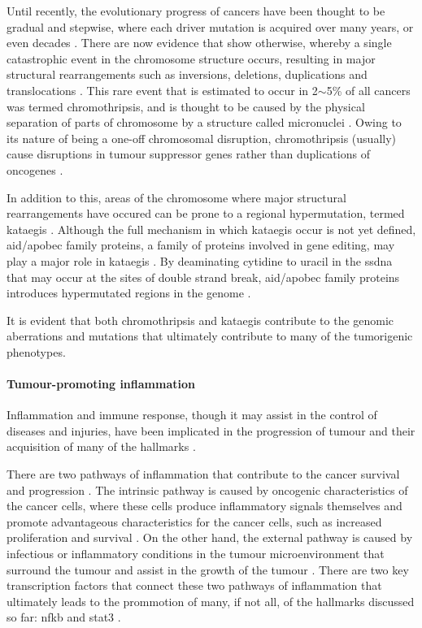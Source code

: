 Until recently, the evolutionary progress of cancers have been thought to be gradual and stepwise, where each driver mutation is acquired over many years, or even decades \citep{Stephens2011}.
There are now evidence that show otherwise, whereby a single catastrophic event in the chromosome structure occurs, resulting in major structural rearrangements such as inversions, deletions, duplications and translocations \citep{Leibowitz2015,Stephens2011}.
This rare event that is estimated to occur in 2$\sim$5\% of all cancers was termed \gls{chromothripsis}, and is thought to be caused by the physical separation of parts of chromosome by a structure called micronuclei \citep{Leibowitz2015,Stephens2011}.
Owing to its nature of being a one-off chromosomal disruption, chromothripsis (usually) cause disruptions in tumour suppressor genes rather than duplications of oncogenes \citep{Leibowitz2015}.

In addition to this, areas of the chromosome where major structural rearrangements have occured can be prone to a regional hypermutation, termed \gls{kataegis} \citep{Leibowitz2015,Nik-Zainal2012}.
Although the full mechanism in which \gls{kataegis} occur is not yet defined, \gls{aid}/\acrshort{apobec} family proteins, a family of proteins involved in gene editing, may play a major role in \gls{kataegis} \citep{Leibowitz2015,Nik-Zainal2012}.
By deaminating cytidine to uracil in the \gls{ssdna} that may occur at the sites of double strand break, \gls{aid}/\acrshort{apobec} family proteins introduces hypermutated regions in the genome \citep{Leibowitz2015,Nik-Zainal2012}.

It is evident that both \gls{chromothripsis} and \gls{kataegis} contribute to the genomic aberrations and mutations that ultimately contribute to many of the tumorigenic phenotypes.

\paragraph{Tumour-promoting inflammation}

\noindent
Inflammation and immune response, though it may assist in the control of diseases and injuries, have been implicated in the progression of tumour and their acquisition of many of the hallmarks \citep{Hanahan2011}.

There are two pathways of inflammation that contribute to the cancer survival and progression \citep{Mantovani2008}.
The intrinsic pathway is caused by oncogenic characteristics of the cancer cells, where these cells produce inflammatory signals themselves and promote advantageous characteristics for the cancer cells, such as increased proliferation and survival \citep{Mantovani2008}.
On the other hand, the external pathway is caused by infectious or inflammatory conditions in the tumour microenvironment that surround the tumour and assist in the growth of the tumour \citep{Mantovani2008}.
There are two key transcription factors that connect these two pathways of inflammation that ultimately leads to the prommotion  of many, if not all, of the hallmarks discussed so far: \gls{nfkb} and \gls{stat3} \citep{Mantovani2008}.

